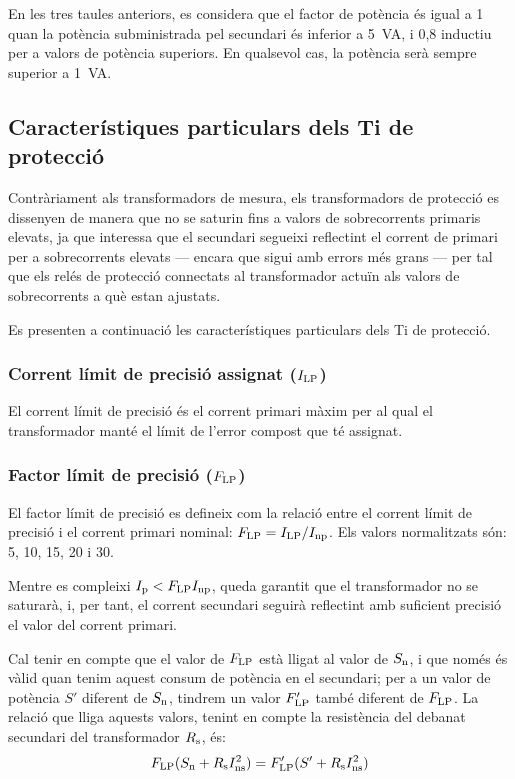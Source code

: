 En les tres taules anteriors, es considera que el factor de
potència és igual a 1 quan la potència subministrada pel secundari és inferior a \qty{5}{VA}, i 0,8 inductiu per a valors de potència superiors. En qualsevol cas, la potència serà sempre superior a \qty{1}{VA}.


\subsection{Característiques particulars dels Ti de protecció}

Contràriament als transformadors de mesura, els transformadors de
protecció es dissenyen de manera que no se saturin fins a  valors
de sobrecorrents primaris elevats, ja que interessa que el
secundari segueixi reflectint el corrent de primari per a
 sobrecorrents elevats --- encara que sigui amb errors més grans --- per
tal que els relés de protecció connectats al transformador actuïn
als valors de sobrecorrents a què estan ajustats.

Es presenten a continuació les característiques particulars dels Ti
de protecció.

\subsubsection{Corrent límit de precisió assignat ($I_\mathrm{LP}$)}

El corrent
límit de precisió és el corrent primari màxim per al qual el transformador manté el límit
de l'error compost que té assignat.

\subsubsection{Factor límit de precisió ($F_\mathrm{LP}$) }

 El factor límit de precisió
es defineix com la relació entre el corrent límit de precisió
i el corrent primari nominal: $F_\mathrm{LP} = I_\mathrm{LP} /I_\mathrm{np}$.
Els valors normalitzats són: 5, 10, 15, 20 i 30.

Mentre es compleixi  $I_\mathrm{p}<F_\mathrm{LP} I_\mathrm{np}$, queda garantit
que el transformador no se saturarà, i, per tant, el corrent
secundari seguirà reflectint amb suficient precisió el valor del
corrent primari.

Cal tenir en compte que el valor de $F_\mathrm{LP}$ està lligat
 al valor de $S_\mathrm{n}$, i que només és vàlid
quan tenim aquest consum de  potència en el secundari; per a un
valor de potència $S'$ diferent de $S_\mathrm{n}$, tindrem un valor
$F'_\mathrm{LP}$ també diferent de  $F_\mathrm{LP}$. La relació que
lliga aquests valors, tenint en compte la resistència del debanat
secundari del transformador  $R_\mathrm{s}$, és:
\begin{equation}\label{eq:flp}
    F_\mathrm{LP} (S_\mathrm{n}+R_\mathrm{s}I_\mathrm{ns}^2) =
    F'_\mathrm{LP} (S'+R_\mathrm{s}I_\mathrm{ns}^2)
\end{equation}

